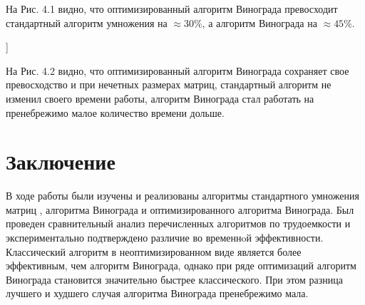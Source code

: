 \documentclass[a4paper,12pt]{report}
\begin{document}
На Рис. 4.1 видно, что оптимизированный алгоритм Винограда превосходит стандартный алгоритм умножения на $\approx 30\%$, а алгоритм Винограда на $\approx45\%$.

]

На Рис. 4.2 видно, что оптимизированный алгоритм Винограда сохраняет свое превосходство и при нечетных размерах матриц, стандартный алгоритм не изменил своего времени работы, алгоритм Винограда стал работать на пренебрежимо малое количество времени дольше.

\newpage
\chapter*{Заключение}
\hspace{0.6cm}В ходе работы были изучены и реализованы алгоритмы стандартного умножения матриц , алгоритма Винограда и оптимизированного алгоритма Винограда. Был проведен сравнительный анализ перечисленных алгоритмов по трудоемкости и экспериментально подтверждено различие во временнoй эффективности. Классический алгоритм в неоптимизированном виде является более эффективным, чем алгоритм Винограда, однако при ряде оптимизаций алгоритм Винограда становится значительно быстрее классического. При этом разница лучшего и худшего случая алгоритма Винограда пренебрежимо мала.
       
\end{document}

